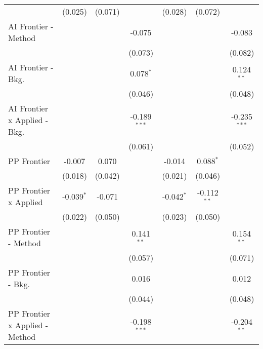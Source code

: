 \begin{tabular}{lcccccc}
                                  & (0.025)       & (0.071)     &                & (0.028)       & (0.072)       &   \\   
   AI Frontier - Method           &               &             & -0.075         &               &               & -0.083\\   
                                  &               &             & (0.073)        &               &               & (0.082)\\   
   AI Frontier - Bkg.             &               &             & 0.078$^{*}$    &               &               & 0.124$^{**}$\\   
                                  &               &             & (0.046)        &               &               & (0.048)\\   
   AI Frontier x Applied - Bkg.   &               &             & -0.189$^{***}$ &               &               & -0.235$^{***}$\\   
                                  &               &             & (0.061)        &               &               & (0.052)\\   
   PP Frontier                    & -0.007        & 0.070       &                & -0.014        & 0.088$^{*}$   &   \\   
                                  & (0.018)       & (0.042)     &                & (0.021)       & (0.046)       &   \\   
   PP Frontier x Applied          & -0.039$^{*}$  & -0.071      &                & -0.042$^{*}$  & -0.112$^{**}$ &   \\   
                                  & (0.022)       & (0.050)     &                & (0.023)       & (0.050)       &   \\   
   PP Frontier - Method           &               &             & 0.141$^{**}$   &               &               & 0.154$^{**}$\\   
                                  &               &             & (0.057)        &               &               & (0.071)\\   
   PP Frontier - Bkg.             &               &             & 0.016          &               &               & 0.012\\   
                                  &               &             & (0.044)        &               &               & (0.048)\\   
   PP Frontier x Applied - Method &               &             & -0.198$^{***}$ &               &               & -0.204$^{**}$\\   

\end{tabular}
